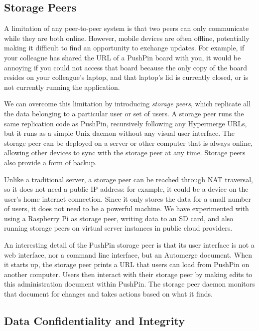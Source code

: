 \documentclass[sigplan,10pt]{acmart}
\begin{document}
\subsection{Storage Peers}

A limitation of any peer-to-peer system is that two peers can only communicate while they are both online.
However, mobile devices are often offline, potentially making it difficult to find an opportunity to exchange updates.
For example, if your colleague has shared the URL of a PushPin board with you, it would be annoying if you could not access that board because the only copy of the board resides on your colleague's laptop, and that laptop's lid is currently closed, or is not currently running the application.

We can overcome this limitation by introducing \emph{storage peers}, which replicate all the data belonging to a particular user or set of users.
A storage peer runs the same replication code as PushPin, recursively following any Hypermerge URLs, but it runs as a simple Unix daemon without any visual user interface.
The storage peer can be deployed on a server or other computer that is always online, allowing other devices to sync with the storage peer at any time.
Storage peers also provide a form of backup.

Unlike a traditional server, a storage peer can be reached through NAT traversal, so it does not need a public IP address: for example, it could be a device on the user's home internet connection.
Since it only stores the data for a small number of users, it does not need to be a powerful machine.
We have experimented with using a Raspberry Pi as storage peer, writing data to an SD card, and also running storage peers on virtual server instances in public cloud providers.

An interesting detail of the PushPin storage peer is that its user interface is not a web interface, nor a command line interface, but an Automerge document.
When it starts up, the storage peer prints a URL that users can load from PushPin on another computer.
Users then interact with their storage peer by making edits to this administration document within PushPin.
The storage peer daemon monitors that document for changes and takes actions based on what it finds.

\subsection{Data Confidentiality and Integrity}
\end{document}
